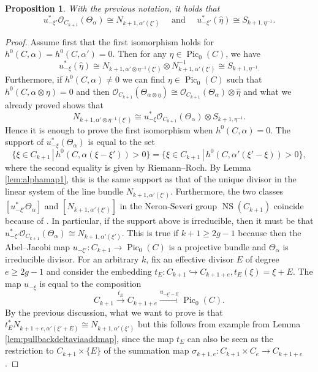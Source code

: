 \documentclass[12pt]{amsart}
\newcounter{thmcounter}
\numberwithin{equation}{section}
\numberwithin{thmcounter}{section}
\newtheorem{proposition}[thmcounter]{Proposition}
\theoremstyle{definition}
\theoremstyle{claim}
\newcommand{\sO}{\mathscr{O}}
\DeclareMathOperator{\Pic}{Pic}
\begin{document}
\begin{proposition}\label{prop:pullback_theta}
	With the previous notation, it holds that
	\[ u_{-\xi'}^*\sO_{C_{k+1}}({\Theta_{\alpha}}) \cong N_{k+1,\alpha'(\xi')}  \quad \text{ and } \quad u_{-\xi'}^*(\widehat{\eta}) \cong S_{k+1,\eta^{-1}} .\]
\end{proposition}
\begin{proof}
	Assume first that the first isomorphism holds for  $h^0(C,\alpha)=h^0(C,\alpha')=0$. Then  for any $\eta\in \Pic_0(C)$, we have 
	\[ u_{-\xi}^*(\widehat{\eta}) \cong N_{k+1,\alpha'\otimes\eta^{-1}(\xi')}\otimes N_{k+1,\alpha'(\xi')}^{-1} \cong S_{k+1,\eta^{-1}.} \]
	Furthermore, if $h^0(C,\alpha)\ne 0$ we can find $\eta\in \Pic_0(C)$ such that $h^0(C,\alpha\otimes\eta)=0$ and then $\sO_{C_{k+1}}(\Theta_{\alpha\otimes\eta})\cong \sO_{C_{k+1}}(\Theta_{\alpha})\otimes \widehat{\eta}$ and what we already proved shows that
	\[  N_{k+1,\alpha'\otimes\eta^{-1}(\xi')} \cong u^*_{-\xi}\sO_{C_{k+1}}(\Theta_{\alpha})\otimes S_{k+1,\eta^{-1}} .\]
	Hence it is enough to prove the first isomorphism when $h^0(C,\alpha)=0$.
	The support of $u^*_{-\xi}(\Theta_{\alpha})$ is equal to the set
	\[  \{ \xi\in C_{k+1} \,|\, h^0(C,\alpha(\xi-\xi')) > 0 \} = \{ \xi \in C_{k+1} \,|\, h^0(C,\alpha'(\xi'-\xi))>0\}, \]
	where the second equality is given by Riemann--Roch. By Lemma \ref{lem:alphamap1}, this is the same support as that of the unique divisor  in the linear system of the line bundle $N_{k+1,\alpha'(\xi')}$. Furthermore, the two classes  $[u^*_{-\xi'}\Theta_{\alpha}]$ and $[N_{k+1,\alpha'(\xi')}]$ in the Neron-Severi group $\operatorname{NS}(C_{k+1})$ coincide because of \cite[Lemma VIII.3.2]{ACGH}. In particular, if the support above is irreducible, then it must be that $u_{-\xi'}^*\sO_{C_{k+1}}(\Theta_{\alpha}) \cong N_{k+1,\alpha'(\xi')}$. This is true if $k+1\geq 2g-1$ because then the Abel--Jacobi map $u_{-\xi'}\colon C_{k+1}\rightarrow \Pic_0(C)$ is a projective bundle and $\Theta_{\alpha}$ is irreducible divisor. For an arbitrary $k$, fix an effective divisor $E$ of degree $e\geq 2g-1$ and consider the embedding $t_{E}\colon C_{k+1} \hookrightarrow C_{k+1+e},t_{E}(\xi)=\xi+E$. The map $u_{-\xi}$ is equal to the composition
	\[ C_{k+1} \overset{t_{E}}{\longrightarrow} C_{k+1+e} \overset{u_{-\xi'-E}}{\longrightarrow} \Pic_0(C).  \]
	By the previous discussion, what we want to prove is that
	$t_E^*N_{k+1+e,\alpha'(\xi'+E)}\cong N_{k+1,\alpha'(\xi')}$ but this follows from example from Lemma \ref{lem:pullbackdeltaviaaddmap}, since the map $t_E$ can also be seen as the restriction to $C_{k+1}\times\{E\}$ of the summation map $\sigma_{k+1,e}\colon C_{k+1}\times C_e\to C_{k+1+e}$.
\end{proof}
\end{document}

